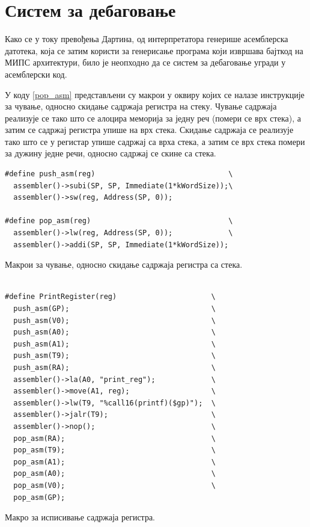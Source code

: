 \documentclass[12pt,oneside]{memoir}
\begin{document}
\section{Систем за дебаговање}
\label{sec:debagovanje}
Како се у току превођења Дартина, од интерпретатора генерише асемблерска датотека, која се затим користи за генерисање програма који извршава бајткод на МИПС архитектури, било је неопходно да се систем за дебаговање угради у асемблерски код.

У коду \ref{pop_asm} представљени су макрои у оквиру којих се налазе инструкције за чување, односно скидање садржаја регистра на стеку. Чување садржаја реализује се тако што се алоцира меморија за једну реч (помери се врх стека), а затим се садржај регистра упише на врх стека. Скидање садржаја се реализује тако што се у регистар упише садржај са врха стека, а затим се врх стека помери за дужину једне речи, односно садржај се скине са стека.

\begin{listing}
\begin{verbatim}
#define push_asm(reg)                               \
  assembler()->subi(SP, SP, Immediate(1*kWordSize));\
  assembler()->sw(reg, Address(SP, 0));

#define pop_asm(reg)                                \
  assembler()->lw(reg, Address(SP, 0));             \
  assembler()->addi(SP, SP, Immediate(1*kWordSize));
\end{verbatim}
\caption{Макрои за чување, односно скидање садржаја регистра са стека.}
\label{pop_asm}
\end{listing}

\begin{listing}
\begin{verbatim}

#define PrintRegister(reg)                      \
  push_asm(GP);                                 \
  push_asm(V0);                                 \
  push_asm(A0);                                 \
  push_asm(A1);                                 \
  push_asm(T9);                                 \
  push_asm(RA);                                 \
  assembler()->la(A0, "print_reg");             \
  assembler()->move(A1, reg);                   \
  assembler()->lw(T9, "%call16(printf)($gp)");  \
  assembler()->jalr(T9);                        \
  assembler()->nop();                           \
  pop_asm(RA);                                  \
  pop_asm(T9);                                  \
  pop_asm(A1);                                  \
  pop_asm(A0);                                  \
  pop_asm(V0);                                  \
  pop_asm(GP);                                  
\end{verbatim}
\caption{Макро за исписивање садржаја регистра.}
\label{print_reg}
\end{listing}
\end{document}
